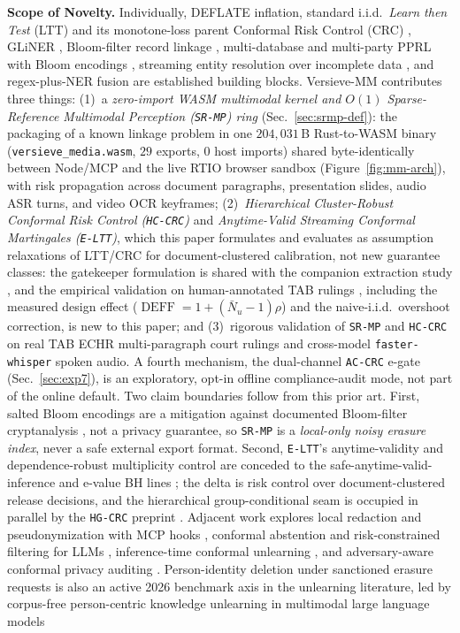 \documentclass{article}
\begin{document}
\textbf{Scope of Novelty.} Individually, DEFLATE inflation, standard i.i.d.\ \emph{Learn then Test} (LTT) \citep{angelopoulos2021ltt} and its monotone-loss parent Conformal Risk Control (CRC) \citep{angelopoulos2023crc}, GLiNER \citep{zaratiana2024gliner}, Bloom-filter record linkage \citep{schnell2009pprl}, multi-database and multi-party PPRL with Bloom encodings \citep{vatsalan2017multippprl}, streaming entity resolution over incomplete data \citep{ren2021terids}, and regex-plus-NER fusion \citep{presidio2021} are established building blocks. Versieve-MM contributes three things: (1)~a \emph{zero-import WASM multimodal kernel and $O(1)$ Sparse-Reference Multimodal Perception (\texttt{SR-MP}) ring} (Sec.~\ref{sec:srmp-def}): the packaging of a known linkage problem in one $204{,}031$\,B Rust-to-WASM binary (\texttt{versieve\_media.wasm}, $29$ exports, $0$ host imports) shared byte-identically between Node/MCP and the live RTIO browser sandbox (Figure~\ref{fig:mm-arch}), with risk propagation across document paragraphs, presentation slides, audio ASR turns, and video OCR keyframes; (2)~\emph{Hierarchical Cluster-Robust Conformal Risk Control (\texttt{HC-CRC})} and \emph{Anytime-Valid Streaming Conformal Martingales (\texttt{E-LTT})}, which this paper formulates and evaluates as assumption relaxations of LTT/CRC for document-clustered calibration, not new guarantee classes: the gatekeeper formulation is shared with the companion extraction study \citep{ardiyansyah2026versieve}, and the empirical validation on human-annotated TAB rulings \citep{pilan2022tab}, including the measured design effect ($\operatorname{DEFF} = 1 + (\bar{N}_u - 1)\rho$) and the naive-i.i.d.\ overshoot correction, is new to this paper; and (3)~rigorous validation of \texttt{SR-MP} and \texttt{HC-CRC} on real TAB ECHR multi-paragraph court rulings and cross-model \texttt{faster-whisper} spoken audio. A fourth mechanism, the dual-channel \texttt{AC-CRC} e-gate (Sec.~\ref{sec:exp7}), is an exploratory, opt-in offline compliance-audit mode, not part of the online default. Two claim boundaries follow from this prior art. First, salted Bloom encodings are a mitigation against documented Bloom-filter cryptanalysis \citep{christen2018bloomattack}, not a privacy guarantee, so \texttt{SR-MP} is a \emph{local-only noisy erasure index}, never a safe external export format. Second, \texttt{E-LTT}'s anytime-validity and dependence-robust multiplicity control are conceded to the safe-anytime-valid-inference and e-value BH lines \citep{ramdas2023game,wang2022ebh}; the delta is risk control over document-clustered release decisions, and the hierarchical group-conditional seam is occupied in parallel by the \texttt{HG-CRC} preprint \citep{salem2026hgcrc}. Adjacent work explores local redaction and pseudonymization with MCP hooks \citep{redakto2026incognito}, conformal abstention and risk-constrained filtering for LLMs \citep{abbasiyadkori2024abstention,wang2025safer}, inference-time conformal unlearning \citep{chowdhury2026conformal}, and adversary-aware conformal privacy auditing \citep{cpa2026auditing}. Person-identity deletion under sanctioned erasure requests is also an active 2026 benchmark axis in the unlearning literature, led by corpus-free person-centric knowledge unlearning in multimodal large language models 
\end{document}
